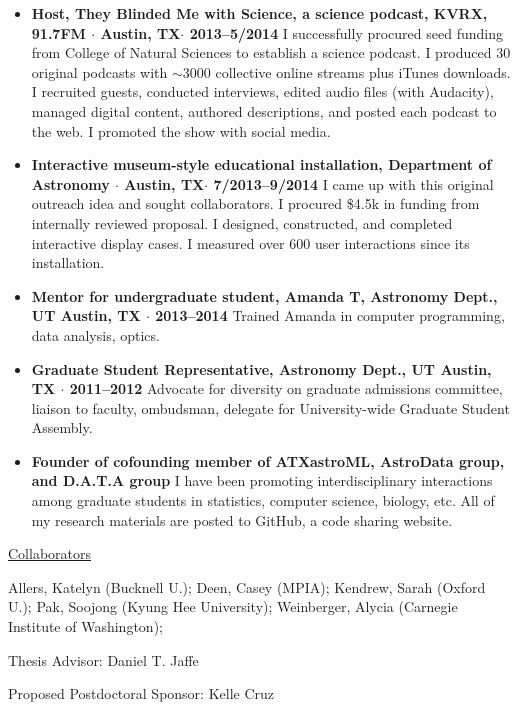 \documentclass[12pt,letterpaper]{article}
\begin{document}
\begin{itemize}

\item \textbf{Host, They Blinded Me with Science, a science podcast, KVRX, 91.7FM $\cdot$ Austin, TX$\cdot$ 2013--5/2014} I successfully procured seed funding from College of Natural Sciences to establish a science podcast.  I produced 30 original podcasts with $\sim3000$ collective online streams plus iTunes downloads.  I recruited guests, conducted interviews, edited audio files (with Audacity), managed digital content, authored descriptions, and posted each podcast to the web.  I promoted the show with social media.

\item \textbf{Interactive museum-style educational installation, Department of Astronomy $\cdot$ Austin, TX$\cdot$ 7/2013--9/2014}  I came up with this original outreach idea and sought collaborators.  I procured \$4.5k in funding from internally reviewed proposal.  I designed, constructed, and completed interactive display cases.  I measured over 600 user interactions since its installation.  

\item \textbf{Mentor for undergraduate student, Amanda T, Astronomy Dept., UT Austin, TX $\cdot$ 2013--2014} Trained Amanda in computer programming, data analysis, optics.

\item \textbf{Graduate Student Representative, Astronomy Dept., UT Austin, TX $\cdot$ 2011--2012} Advocate for diversity on graduate admissions committee, liaison to faculty, ombudsman, delegate for University-wide Graduate Student Assembly.

\item \textbf{Founder of cofounding member of ATXastroML, AstroData group, and D.A.T.A group}  I have been promoting interdisciplinary interactions among graduate students in statistics, computer science, biology, etc.  All of my research materials are posted to GitHub, a code sharing website.

\end{itemize}
	

 \large \underline{Collaborators}
\normalsize

Allers, Katelyn (Bucknell U.); Deen, Casey (MPIA); Kendrew, Sarah (Oxford U.); Pak, Soojong (Kyung Hee University); Weinberger, Alycia (Carnegie Institute of Washington);  

Thesis Advisor: Daniel T. Jaffe

Proposed Postdoctoral Sponsor: Kelle Cruz
\end{document}
